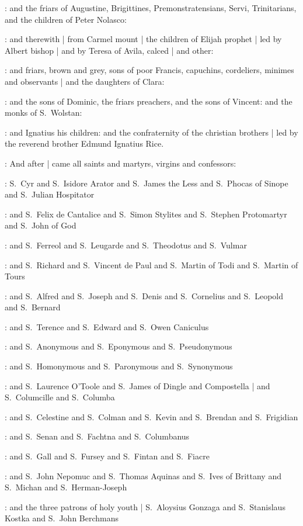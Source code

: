 :
and the friars of Augustine,
Brigittines,
Premonstratensians,
Servi,
Trinitarians,
and the children of Peter Nolasco:

:
and therewith |
from Carmel mount |
the children of Elijah prophet |
led by Albert bishop |
and by Teresa of Avila,
calced |
and other:

:
and friars,
brown and grey,
sons of poor Francis,
capuchins,
cordeliers,
minimes and observants |
and the daughters of Clara:

:
and the sons of Dominic,
the friars preachers,
and the sons of Vincent:
and the monks of S.~Wolstan:

:
and Ignatius his children:
and the confraternity of the christian brothers |
led by the reverend brother Edmund Ignatius Rice.

:
And after |
came all saints and martyrs,
virgins and confessors:

:
S.~Cyr
and S.~Isidore Arator
and S.~James the Less
and S.~Phocas of Sinope
and S.~Julian Hospitator

:
and S.~Felix de Cantalice
and S.~Simon Stylites
and S.~Stephen Protomartyr
and S.~John of God

:
and S.~Ferreol
and S.~Leugarde
and S.~Theodotus
and S.~Vulmar

:
and S.~Richard
and S.~Vincent de Paul
and S.~Martin of Todi
and S.~Martin of Tours

:
and S.~Alfred
and S.~Joseph
and S.~Denis
and S.~Cornelius
and S.~Leopold
and S.~Bernard

:
and S.~Terence
and S.~Edward
and S.~Owen Caniculus

:
and S.~Anonymous
and S.~Eponymous
and S.~Pseudonymous

:
and S.~Homonymous
and S.~Paronymous
and S.~Synonymous

:
and S.~Laurence O'Toole
and S.~James of Dingle and Compostella |
and S.~Columcille
and S.~Columba

:
and S.~Celestine
and S.~Colman
and S.~Kevin
and S.~Brendan
and S.~Frigidian

:
and S.~Senan
and S.~Fachtna
and S.~Columbanus

:
and S.~Gall
and S.~Fursey
and S.~Fintan
and S.~Fiacre

:
and S.~John Nepomuc
and S.~Thomas Aquinas
and S.~Ives of Brittany
and S.~Michan
and S.~Herman-Joseph

:
and the three patrons of holy youth |
S.~Aloysius Gonzaga
and S.~Stanislaus Kostka
and S.~John Berchmans

